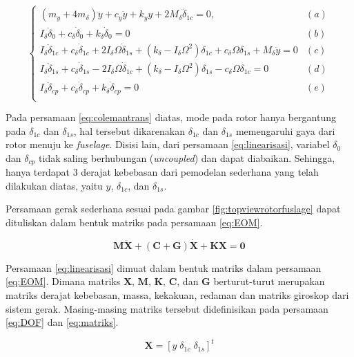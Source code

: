 \begin{equation}
	\begin{cases}
	(m_y+4m_{\delta})\ddot{y}+c_y\dot{y}+k_yy+2M_{\delta}\ddot{\delta}_{1c}=0, &(a)\\
	I_{\delta}\ddot{\delta}_0+c_{\delta}\dot{\delta}_0+k_{\delta}\dot{\delta}_0=0&(b)\\
	I_{\delta}\ddot{\delta}_{1c}+c_{\delta}\dot{\delta}_{1c}+2I_{\delta}\Omega\dot{\delta}_{1s}+(k_{\delta}-I_{\delta}\Omega^2)\delta_{1c}+c_{\delta}\Omega\delta_{1s}+M_{\delta}\ddot{y}=0&(c)\\	I_{\delta}\ddot{\delta}_{1s}+c_{\delta}\dot{\delta}_{1s}-2I_{\delta}\Omega\dot{\delta}_{1c}+(k_{\delta}-I_{\delta}\Omega^2)\delta_{1s}-c_{\delta}\Omega\delta_{1c}=0&(d)\\
	I_{\delta}\ddot{\delta}_{cp}+c_{\delta}\dot{\delta}_{cp}+k_{\delta}\dot{\delta}_{cp}=0&(e)\\
	\end{cases}
	\label{eq:linearisasi}
\end{equation}

Pada persamaan \ref{eq:colemantrans} diatas, mode pada rotor hanya bergantung pada $\delta_{1c}$ dan $\delta_{1s}$, hal tersebut dikarenakan $\delta_{1c}$ dan $\delta_{1s}$ memengaruhi gaya dari rotor menuju ke \textit{fuselage}. Disisi lain, dari persamaan \ref{eq:linearisasi}, variabel $\delta_0$ dan $\delta_{cp}$ tidak saling berhubungan (\textit{uncoupled}) dan dapat diabaikan. Sehingga, hanya terdapat 3 derajat kebebasan dari pemodelan sederhana yang telah dilakukan diatas, yaitu $y$, $\delta_{1c}$, dan $\delta_{1s}$.

Persamaan gerak sederhana sesuai pada gambar \ref{fig:topviewrotorfuslage} dapat dituliskan dalam bentuk matriks pada persamaan \ref{eq:EOM}.

\begin{equation}
	\label{eq:EOM}
	\mathbf{M\ddot{X}}+(\mathbf{C}+\mathbf{G})\mathbf{\dot{X}}+\mathbf{KX}=\mathbf{0}
\end{equation}

Persamaan \ref{eq:linearisasi} dimuat dalam bentuk matriks dalam persamaan \ref{eq:EOM}. Dimana matriks $\mathbf{X}$, $\mathbf{M}$, $\mathbf{K}$, $\mathbf{C}$, dan $\mathbf{G}$ berturut-turut merupakan matriks derajat kebebasan, massa, kekakuan, redaman dan matriks giroskop dari sistem gerak. Masing-masing matriks tersebut didefinisikan pada persamaan \ref{eq:DOF} dan \ref{eq:matriks}.

\begin{equation}
	\label{eq:DOF}
	\mathbf{X}=[y \; \delta_{1c} \; \delta_{1s}]^t
\end{equation}

